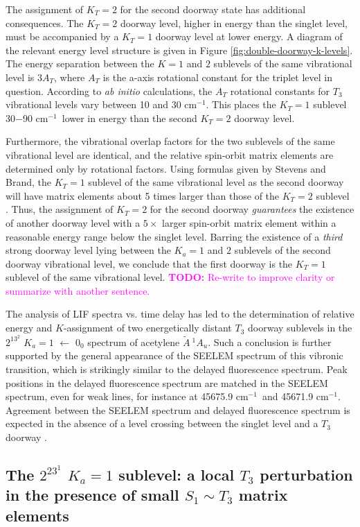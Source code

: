 \documentclass[12pt]{mitthesis}
\newcommand{\TODO} [1]{\textcolor{magenta}{\textbf{TODO:} #1}}
\newcommand{\rcm}{cm$^{-1}$}
\newcommand{\astate}{$
  \tilde{A} \: ^1\!A_u
  $}
\newcommand{\Ka}[1]{$K_a\!\!=\!#1$}
\begin{document}
The assignment of $K_T=2$ for the second doorway state has additional
consequences.  The $K_T=2$ doorway level, higher in energy than the
singlet level, must be accompanied by a $K_T=1$ doorway level at lower
energy.  A diagram of the relevant energy level structure is given in
Figure \ref{fig:double-doorway-k-levels}. The energy separation
between the $K=1$ and $2$ sublevels of the same vibrational level is
$3A_T$, where $A_T$ is the a-axis rotational constant for the triplet
level in question.  According to \emph{ab initio} calculations, the
$A_T$ rotational constants for $T_3$ vibrational levels vary between
10 and 30 \rcm \cite{thom07}.  This places the $K_T=1$ sublevel
30$-$90 \rcm\ lower in energy than the second $K_T=2$ doorway level.

Furthermore, the vibrational overlap factors for the two sublevels of
the same vibrational level are identical, and the relative spin-orbit
matrix elements are determined only by rotational factors.  Using
formulas given by Stevens and Brand, the $K_T=1$ sublevel of the same
vibrational level as the second doorway will have matrix elements
about 5 times larger than those of the $K_T=2$ sublevel
\cite{stevens73}.  Thus, the assignment of $K_T=2$ for the second
doorway \emph{guarantees} the existence of another doorway level with
a $5 \times$ larger spin-orbit matrix element within a reasonable
energy range below the singlet level.  Barring the existence of a
\emph{third} strong doorway level lying between the $K_a=1$ and $2$
sublevels of the second doorway vibrational level, we conclude that
the first doorway is the $K_T=1$ sublevel of the same vibrational
level.  \TODO{Re-write to improve clarity or summarize with another
  sentence.}

The analysis of LIF spectra vs. time delay has led to the
determination of relative energy and $K$-assignment of two
energetically distant $T_3$ doorway sublevels in the $2^13^2$ \Ka{1}
$\leftarrow$ $0_0$ spectrum of acetylene \astate.  Such a conclusion
is further supported by the general appearance of the SEELEM spectrum
of this vibronic transition, which is strikingly similar to the
delayed fluorescence spectrum.  Peak positions in the delayed
fluorescence spectrum are matched in the SEELEM spectrum, even for
weak lines, for instance at 45675.9 \rcm\ and 45671.9 \rcm.  Agreement
between the SEELEM spectrum and delayed fluorescence spectrum is
expected in the absence of a level crossing between the singlet level
and a $T_3$ doorway \cite{altunata01}.


\subsection{The $2^23^1$ \Ka{1} sublevel: a local $T_3$
  perturbation in the presence of small $S_1 \sim T_3$ matrix
  elements}
\end{document}
